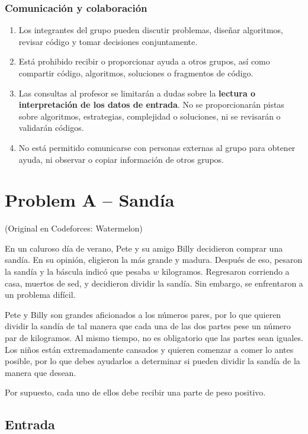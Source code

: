 \documentclass[10pt,letterpaper]{article}
\newcommand{\problem}[2]{
  \clearpage

  \section*{Problem #1 -- #2}

  \addcontentsline{toc}{section}{Problem #1 -- #2}
}
\newcommand{\inputsection}{
  \subsection*{Entrada}
}
\begin{document}
\subsubsection*{Comunicación y colaboración}

\begin{enumerate}[leftmargin=*]
  \item Los integrantes del grupo pueden discutir problemas, diseñar algoritmos, revisar código y tomar decisiones conjuntamente.
  \item Está prohibido recibir o proporcionar ayuda a otros grupos, así como compartir código, algoritmos, soluciones o fragmentos de código.
  \item Las consultas al profesor se limitarán a dudas sobre la \textbf{lectura o interpretación de los datos de entrada}. No se proporcionarán pistas sobre algoritmos, estrategias, complejidad o soluciones, ni se revisarán o validarán códigos.
  \item No está permitido comunicarse con personas externas al grupo para obtener ayuda, ni observar o copiar información de otros grupos.
\end{enumerate}





\problem{A}{Sandía}
{\vspace{-0.5cm} \scriptsize (Original en Codeforces: Watermelon)}

En un caluroso día de verano, Pete y su amigo Billy decidieron comprar una sandía. En su opinión, eligieron la más grande y madura. Después de eso, pesaron la sandía y la báscula indicó que pesaba $w$ kilogramos. Regresaron corriendo a casa, muertos de sed, y decidieron dividir la sandía. Sin embargo, se enfrentaron a un problema difícil.

Pete y Billy son grandes aficionados a los números pares, por lo que quieren dividir la sandía de tal manera que cada una de las dos partes pese un número par de kilogramos. Al mismo tiempo, no es obligatorio que las partes sean iguales. Los niños están extremadamente cansados y quieren comenzar a comer lo antes posible, por lo que debes ayudarlos a determinar si pueden dividir la sandía de la manera que desean.

Por supuesto, cada uno de ellos debe recibir una parte de peso positivo.

\inputsection
\end{document}

